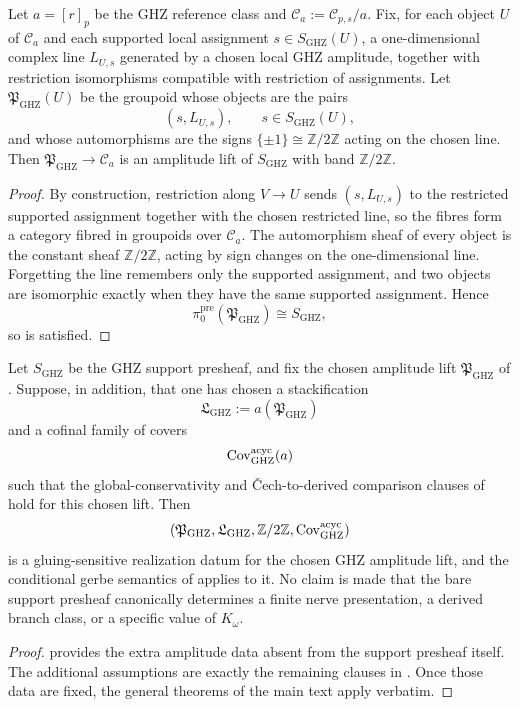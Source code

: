 \begin{lemma}\label{lem:ghz-prestack}
Let $a=[r]_p$ be the GHZ reference class and $\mathcal C_a:=\mathcal C_{p,s}/a$. Fix, for each object $U$ of $\mathcal C_a$ and each supported local assignment $s\in S_{\mathrm{GHZ}}(U)$, a one-dimensional complex line $L_{U,s}$ generated by a chosen local GHZ amplitude, together with restriction isomorphisms compatible with restriction of assignments. Let $\mathfrak P_{\mathrm{GHZ}}(U)$ be the groupoid whose objects are the pairs
\[
(s,L_{U,s}),
\qquad
s\in S_{\mathrm{GHZ}}(U),
\]
and whose automorphisms are the signs $\{\pm 1\}\cong \mathbb Z/2\mathbb Z$ acting on the chosen line. Then $\mathfrak P_{\mathrm{GHZ}}\to\mathcal C_a$ is an amplitude lift of $S_{\mathrm{GHZ}}$ with band $\mathbb Z/2\mathbb Z$.
\end{lemma}

\begin{proof}
By construction, restriction along $V\to U$ sends $(s,L_{U,s})$ to the restricted supported assignment together with the chosen restricted line, so the fibres form a category fibred in groupoids over $\mathcal C_a$. The automorphism sheaf of every object is the constant sheaf $\mathbb Z/2\mathbb Z$, acting by sign changes on the one-dimensional line. Forgetting the line remembers only the supported assignment, and two objects are isomorphic exactly when they have the same supported assignment. Hence
\[
\pi_0^{\mathrm{pre}}(\mathfrak P_{\mathrm{GHZ}})\cong S_{\mathrm{GHZ}},
\]
so  is satisfied.
\end{proof}

\begin{theorem}\label{thm:ghz-realization}
Let $S_{\mathrm{GHZ}}$ be the GHZ support presheaf, and fix the chosen amplitude lift $\mathfrak P_{\mathrm{GHZ}}$ of . Suppose, in addition, that one has chosen a stackification
\[
\mathfrak L_{\mathrm{GHZ}}:=a(\mathfrak P_{\mathrm{GHZ}})
\]
and a cofinal family of covers
\[
\mathrm{Cov}_{\mathrm{GHZ}}^{\mathrm{acyc}}(a)
\]
such that the global-conservativity and \v{C}ech-to-derived comparison clauses of  hold for this chosen lift. Then
\[
(\mathfrak P_{\mathrm{GHZ}},\mathfrak L_{\mathrm{GHZ}},\mathbb Z/2\mathbb Z,\mathrm{Cov}_{\mathrm{GHZ}}^{\mathrm{acyc}})
\]
is a gluing-sensitive realization datum for the chosen GHZ amplitude lift, and the conditional gerbe semantics of  applies to it. No claim is made that the bare support presheaf canonically determines a finite nerve presentation, a derived branch class, or a specific value of $K_\omega$.
\end{theorem}

\begin{proof}
 provides the extra amplitude data absent from the support presheaf itself. The additional assumptions are exactly the remaining clauses in . Once those data are fixed, the general theorems of the main text apply verbatim.
\end{proof}
